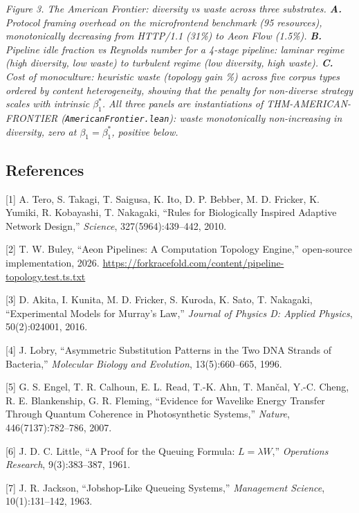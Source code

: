 \documentclass[
  11pt,
]{article}
\begin{document}
\emph{Figure 3. The American Frontier: diversity vs waste across three
substrates. \textbf{A.} Protocol framing overhead on the microfrontend
benchmark (95 resources), monotonically decreasing from HTTP/1.1 (31\%)
to Aeon Flow (1.5\%). \textbf{B.} Pipeline idle fraction vs Reynolds
number for a 4-stage pipeline: laminar regime (high diversity, low
waste) to turbulent regime (low diversity, high waste). \textbf{C.} Cost
of monoculture: heuristic waste (topology gain \%) across five corpus
types ordered by content heterogeneity, showing that the penalty for
non-diverse strategy scales with intrinsic \(β_{1}^{*}\). All three
panels are instantiations of THM-AMERICAN-FRONTIER
(\texttt{AmericanFrontier.lean}): waste monotonically non-increasing in
diversity, zero at \(β_{1} = β_{1}^{*}\), positive below.}

\subsection{References}\label{references}

{[}1{]} A. Tero, S. Takagi, T. Saigusa, K. Ito, D. P. Bebber, M. D.
Fricker, K. Yumiki, R. Kobayashi, T. Nakagaki, ``Rules for Biologically
Inspired Adaptive Network Design,'' \emph{Science}, 327(5964):439--442,
2010.

{[}2{]} T. W. Buley, ``Aeon Pipelines: A Computation Topology Engine,''
open-source implementation, 2026.
\url{https://forkracefold.com/content/pipeline-topology.test.ts.txt}

{[}3{]} D. Akita, I. Kunita, M. D. Fricker, S. Kuroda, K. Sato, T.
Nakagaki, ``Experimental Models for Murray's Law,'' \emph{Journal of
Physics D: Applied Physics}, 50(2):024001, 2016.

{[}4{]} J. Lobry, ``Asymmetric Substitution Patterns in the Two DNA
Strands of Bacteria,'' \emph{Molecular Biology and Evolution},
13(5):660--665, 1996.

{[}5{]} G. S. Engel, T. R. Calhoun, E. L. Read, T.-K. Ahn, T. Mančal,
Y.-C. Cheng, R. E. Blankenship, G. R. Fleming, ``Evidence for Wavelike
Energy Transfer Through Quantum Coherence in Photosynthetic Systems,''
\emph{Nature}, 446(7137):782--786, 2007.

{[}6{]} J. D. C. Little, ``A Proof for the Queuing Formula:
\(L = \lambda W\),'' \emph{Operations Research}, 9(3):383--387, 1961.

{[}7{]} J. R. Jackson, ``Jobshop-Like Queueing Systems,''
\emph{Management Science}, 10(1):131--142, 1963.
\end{document}
